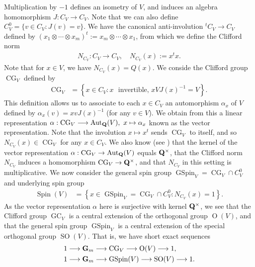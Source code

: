 \documentclass{amsart}
\theoremstyle{definition}
\begin{document}
Multiplication by $-1$ defines an isometry of $V$, and induces an algebra homomorphism $J: C_V \rightarrow C_V$. 
Note that we can also define $C_V^0 = \lbrace v \in C_V: J(v)=v \rbrace$. 
We have the canonical anti-involution ${}^tC_V \rightarrow C_V$ defined by $(x_1 \otimes \cdots \otimes x_m)^t := x_m \otimes \cdots \otimes x_1$,
from which we define the Clifford norm
\begin{align*} N_{C_V}: C_V \longrightarrow C_V, \quad N_{C_V}(x) := x^t x. \end{align*}
Note that for $x \in V$, we have $N_{C_V}(x) = Q(x)$. We conside the Clifford group $\operatorname{CG}_V$ defined by
\begin{align*} \operatorname{CG}_V &= \left\lbrace x \in C_V : x \text{ ~invertible,~} x V J(x)^{-1} = V  \right\rbrace. \end{align*}
This definition allows us to associate to each $x \in C_V$ an automorphism $\alpha_x$ of $V$ defined by $\alpha_x(v) = x v J(x)^{-1}$
(for any $v \in V$). We obtain from this a linear representation 
$\alpha: \operatorname{CG}_V \longrightarrow \operatorname{Aut}_{\bf{Q}}(V), ~ x \mapsto \alpha_x$ known as the vector representation. 
Note that the involution $x \mapsto x^t$ sends $\operatorname{CG}_V$ to itself, and so $N_{C_V}(x) \in \operatorname{CG}_V$ for any $x \in C_V$. 
We also know (see \cite[Lemma 2.11]{Br}) that the kernel of the vector representation $\alpha: \operatorname{CG}_V \rightarrow \operatorname{Aut}_{\bf{Q}}(V)$
equals ${\bf{Q}}^{\times}$, that the Clifford norm $N_{C_V}$ induces a homomorphism $\operatorname{CG}_V \rightarrow {\bf{Q}}^{\times}$, and that $N_{C_V}$ in this setting is multiplicative. 
We now consider the general spin group $\operatorname{GSpin}_V = \operatorname{CG}_V \cap C_V^0$ and underlying spin group
\begin{align*} \operatorname{Spin}(V) 
&= \left\lbrace x \in \operatorname{GSpin}_V = \operatorname{CG}_V \cap C_V^0: N_{C_V}(x) = 1 \right\rbrace.\end{align*}
As the vector representation $\alpha$ here is surjective with kernel ${\bf{Q}}^{\times}$,
we see that the Clifford group $\operatorname{GC}_V$ is a central extension of the orthogonal group $\operatorname{O}(V)$, 
and that the general spin group $\operatorname{GSpin}_V$ is a central extension of the special orthogonal group 
$\operatorname{SO}(V)$. That is, we have short exact sequences
\begin{equation}\begin{aligned}\label{GSpinSES} 1 &\longrightarrow {\bf{G}}_m \longrightarrow \operatorname{CG}_V \longrightarrow \operatorname{O}(V) \longrightarrow 1, \\
1 &\longrightarrow {\bf{G}}_m \longrightarrow \operatorname{GSpin}(V) \longrightarrow \operatorname{SO}(V) \longrightarrow 1.\end{aligned}\end{equation}
\end{document}
